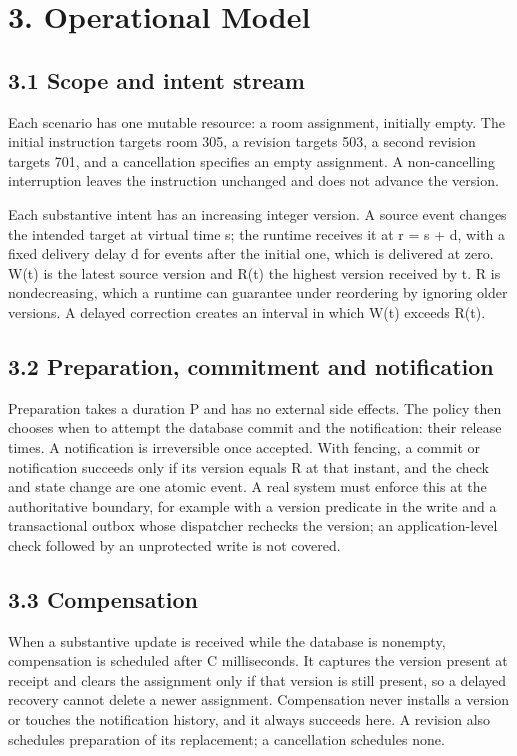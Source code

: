 \documentclass[11pt]{article}
\begin{document}
\section*{3. Operational Model}

\subsection*{3.1 Scope and intent stream}

Each scenario has one mutable resource: a room assignment, initially empty. The initial instruction targets room 305, a revision targets 503, a second revision targets 701, and a cancellation specifies an empty assignment. A non-cancelling interruption leaves the instruction unchanged and does not advance the version.


Each substantive intent has an increasing integer version. A source event changes the intended target at virtual time s; the runtime receives it at r = s + d, with a fixed delivery delay d for events after the initial one, which is delivered at zero. W(t) is the latest source version and R(t) the highest version received by t. R is nondecreasing, which a runtime can guarantee under reordering by ignoring older versions. A delayed correction creates an interval in which W(t) exceeds R(t).


\subsection*{3.2 Preparation, commitment and notification}

Preparation takes a duration P and has no external side effects. The policy then chooses when to attempt the database commit and the notification: their release times. A notification is irreversible once accepted. With fencing, a commit or notification succeeds only if its version equals R at that instant, and the check and state change are one atomic event. A real system must enforce this at the authoritative boundary, for example with a version predicate in the write and a transactional outbox whose dispatcher rechecks the version; an application-level check followed by an unprotected write is not covered.


\subsection*{3.3 Compensation}

When a substantive update is received while the database is nonempty, compensation is scheduled after C milliseconds. It captures the version present at receipt and clears the assignment only if that version is still present, so a delayed recovery cannot delete a newer assignment. Compensation never installs a version or touches the notification history, and it always succeeds here. A revision also schedules preparation of its replacement; a cancellation schedules none.
\end{document}
